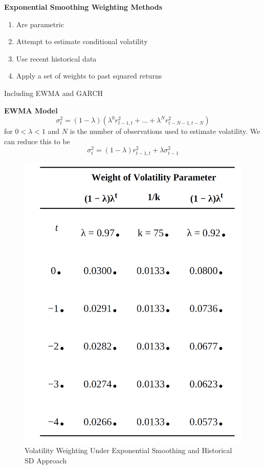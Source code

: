 \documentclass[11pt,fleqn]{report} %
\numberwithin{equation}{section} %
\numberwithin{figure}{section} %
\numberwithin{table}{section} %
\begin{document}
\begin{definition}\textbf{Exponential Smoothing Weighting Methods}
\begin{enumerate}
    \item Are parametric
    \item Attempt to estimate conditional volatility
    \item Use recent historical data
    \item Apply a set of weights to past squared returns
\end{enumerate}
Including EWMA and GARCH
\end{definition}
\begin{theorem}\textbf{EWMA Model}\\ 
$$
\sigma_t^2=(1-\lambda)\left(\lambda^0r_{t-1,t}^2+\dots+\lambda^Nr_{t-N-1,t-N}^2\right)
$$
for $0<\lambda<1$ and $N$ is the number of observations used to estimate volatility. We can reduce this to be
$$
\sigma_t^2=(1-\lambda)r_{t-1,t}^2+\lambda\sigma_{t-1}^2
$$
\end{theorem}
\begin{figure}[h!]
    \centering
    \includegraphics[scale=0.5]{exponential.PNG}
    \caption{Volatility Weighting Under Exponential Smoothing and Historical SD Approach}
\end{figure}
\end{document}
